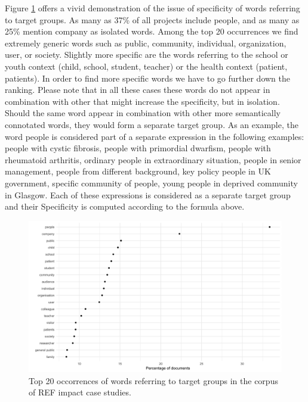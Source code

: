 \documentclass[b5paper,]{book}
\theoremstyle{definition}
\theoremstyle{definition}
\theoremstyle{definition}
\theoremstyle{remark}
\begin{document}
Figure \ref{fig:impactusersdistributions} offers a vivid demonstration
of the issue of specificity of words referring to target groups. As many
as 37\% of all projects include people, and as many as 25\% mention
company as isolated words. Among the top 20 occurrences we find
extremely generic words such as public, community, individual,
organization, user, or society. Slightly more specific are the words
referring to the school or youth context (child, school, student,
teacher) or the health context (patient, patients). In order to find
more specific words we have to go further down the ranking. Please note
that in all these cases these words do not appear in combination with
other that might increase the specificity, but in isolation. Should the
same word appear in combination with other more semantically connotated
words, they would form a separate target group. As an example, the word
people is considered part of a separate expression in the following
examples: people with cystic fibrosis, people with primordial dwarfism,
people with rheumatoid arthritis, ordinary people in extraordinary
situation, people in senior management, people from different
background, key policy people in UK government, specific community of
people, young people in deprived community in Glasgow. Each of these
expressions is considered as a separate target group and their
Specificity is computed according to the formula above.

\begin{figure}

{\centering \includegraphics[width=1\linewidth]{_bookdown_files/figures/impact_users_distributions} 

}

\caption{Top 20 occorrences of words referring to target groups in the corpus of REF impact case studies.}\label{fig:impactusersdistributions}
\end{figure}
\end{document}
